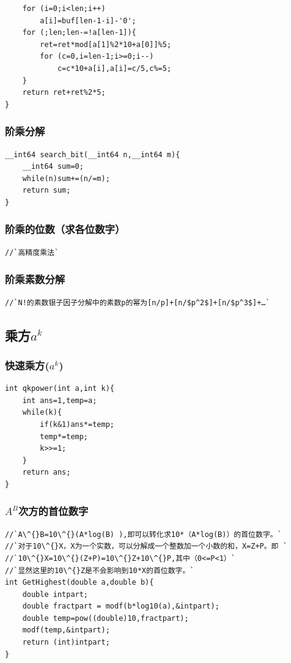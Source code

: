\documentclass[a4paper]{article}
\begin{document}
\begin{CJK*}{UTF8}{gbsn}
\begin{multicols}{3}
\begin{flushleft}
\begin{lstlisting}
    for (i=0;i<len;i++) 
        a[i]=buf[len-1-i]-'0'; 
    for (;len;len-=!a[len-1]){ 
        ret=ret*mod[a[1]%2*10+a[0]]%5; 
        for (c=0,i=len-1;i>=0;i--) 
            c=c*10+a[i],a[i]=c/5,c%=5; 
    } 
    return ret+ret%2*5; 
}
\end{lstlisting}


\subsubsection{阶乘分解}
\begin{lstlisting}
__int64 search_bit(__int64 n,__int64 m){
	__int64 sum=0;
	while(n)sum+=(n/=m);
	return sum;
}
\end{lstlisting}


\subsubsection{阶乘的位数（求各位数字）}
\begin{lstlisting}
//`高精度乘法`
\end{lstlisting}


\subsubsection{阶乘素数分解}
\begin{lstlisting}
//`N!的素数银子因子分解中的素数p的幂为[n/p]+[n/$p^2$]+[n/$p^3$]+…`
\end{lstlisting}

\subsection{乘方$a^k$}

\subsubsection{快速乘方($a^k$)}
\begin{lstlisting}
int qkpower(int a,int k){
	int ans=1,temp=a;
	while(k){
		if(k&1)ans*=temp;
		temp*=temp;
		k>>=1; 
	} 
	return ans; 
} 
\end{lstlisting}


\subsubsection{$A^B$次方的首位数字}
\begin{lstlisting}
//`A\^{}B=10\^{}(A*log(B) ),即可以转化求10*（A*log(B)）的首位数字。`
//`对于10\^{}X，X为一个实数，可以分解成一个整数加一个小数的和，X=Z+P。即 `
//`10\^{}X=10\^{}(Z+P)=10\^{}Z+10\^{}P,其中（0<=P<1）`
//`显然这里的10\^{}Z是不会影响到10*X的首位数字。`
int GetHighest(double a,double b){
    double intpart;
    double fractpart = modf(b*log10(a),&intpart);
    double temp=pow((double)10,fractpart);
    modf(temp,&intpart);
    return (int)intpart;  
}
\end{lstlisting}




\end{flushleft}
\end{multicols}
\end{CJK*}
\end{document}
